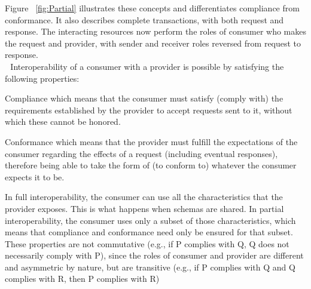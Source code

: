 Figure ~\ref{fig:Partial} illustrates these concepts and differentiates compliance from conformance. It also describes complete transactions, with both request and response. The interacting resources now perform the roles of consumer who makes the request and provider, with sender and receiver roles reversed from request to response.\\ 
Interoperability of a consumer with a provider is possible by satisfying the following properties:

Compliance\citep{compliance:def} which means that the consumer must satisfy (comply with) the requirements established by the provider to accept requests sent to it, without which these cannot be honored.

Conformance\citep{comformance:def2} which means that the provider must fulfill the expectations of the consumer
regarding the effects of a request (including eventual responses), therefore being able to take the form
of (to conform to) whatever the consumer expects it to be. 

In full interoperability, the consumer can use all the characteristics that the provider exposes. This is what happens when schemas are shared. In partial interoperability, the consumer uses only a subset of those characteristics, which means that compliance and conformance need only be ensured for that subset. These properties are not commutative (e.g., if P complies with Q, Q does not necessarily comply with P), since the
roles of consumer and provider are different and asymmetric by nature, but are transitive (e.g., if P complies with Q and Q complies with R, then P complies with R)

